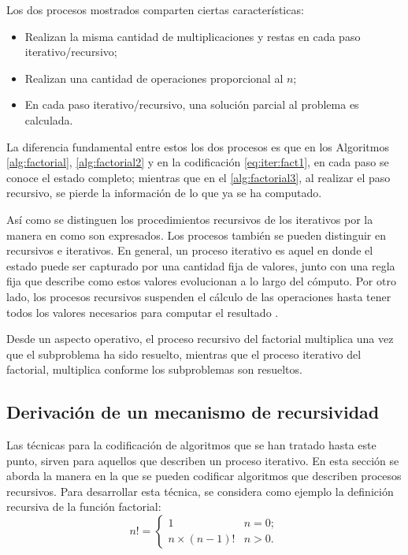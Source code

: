 Los dos procesos mostrados comparten ciertas características:

\begin{itemize}
\item Realizan la misma cantidad de multiplicaciones y restas en cada paso iterativo/recursivo;
\item Realizan una cantidad de operaciones proporcional al $ n $;
\item En cada paso iterativo/recursivo, una solución parcial al problema es calculada.
\end{itemize}

La diferencia fundamental entre estos los dos procesos es que en los Algoritmos \ref{alg:factorial}, \ref{alg:factorial2} y en la codificación \eqref{eq:iter:fact1}, en cada paso se conoce el estado completo; mientras que en el \autoref{alg:factorial3}, al realizar el paso recursivo, se pierde la información de lo que ya se ha computado.

Así como se distinguen los procedimientos recursivos de los iterativos por la manera en como son expresados. Los procesos también se pueden distinguir en recursivos e iterativos. En general, un proceso iterativo es aquel en donde el estado puede ser capturado por una cantidad fija de valores, junto con una regla fija que describe como estos valores evolucionan a lo largo del cómputo. Por otro lado, los procesos recursivos suspenden el cálculo de las operaciones hasta tener todos los valores necesarios para computar el resultado \cite{AbelsonSussman:Wizard}.

Desde un aspecto operativo, el proceso recursivo del factorial multiplica una vez que el subproblema ha sido resuelto, mientras que el proceso iterativo del factorial, multiplica conforme los subproblemas son resueltos.

\subsection{Derivación de un mecanismo de recursividad}
\label{sec:deriv-recursividad}

Las técnicas para la codificación de algoritmos que se han tratado hasta este punto, sirven para aquellos que describen un proceso iterativo. En esta sección se aborda la manera en la que se pueden codificar algoritmos que describen procesos recursivos. Para desarrollar esta técnica, se considera como ejemplo la definición recursiva de la función factorial:
\[ n! =
  \begin{cases}
    1 &n=0;\\
    n\times (n-1)! &n>0.
  \end{cases}
\]

